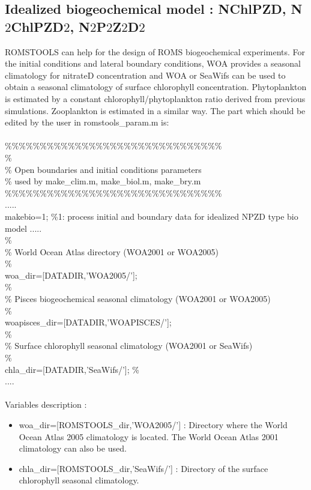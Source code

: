 \subsection{Idealized biogeochemical model : NChlPZD, N$2$ChlPZD$2$, N$2$P$2$Z$2$D$2$}
ROMSTOOLS can help for the design of ROMS biogeochemical
experiments. For the initial conditions and lateral boundary
conditions, WOA provides a seasonal climatology for nitrateD
concentration and WOA or SeaWifs can be used to obtain a 
seasonal climatology of surface chlorophyll concentration.
Phytoplankton is estimated by a constant chlorophyll/phytoplankton 
ratio derived from previous simulations. Zooplankton is estimated
in a similar way. The part which should be edited by the user in 
romstools\_param.m is:\\
\\ 
\%\%\%\%\%\%\%\%\%\%\%\%\%\%\%\%\%\%\%\%\%\%\%\%\%\%\%\%\%\%\%\\
\%\\
\% Open boundaries and initial conditions parameters\\
\%   used by make\_clim.m, make\_biol.m, make\_bry.m\\
\%\%\%\%\%\%\%\%\%\%\%\%\%\%\%\%\%\%\%\%\%\%\%\%\%\%\%\%\%\%\%\\
..... \\
makebio=1;    \%1: process initial and boundary data for idealized NPZD type bio model
..... \\
\noindent \% \\
\% World Ocean Atlas directory (WOA2001 or WOA2005)  \\
\% \\
woa\_dir=[DATADIR,'WOA2005/'];  \\
\% \\
\% Pisces biogeochemical seasonal climatology (WOA2001 or WOA2005)  \\
\% \\
woapisces\_dir=[DATADIR,'WOAPISCES/']; \\
\%\\
\% Surface chlorophyll seasonal climatology (WOA2001 or SeaWifs) \\
\%\\
chla\_dir=[DATADIR,'SeaWifs/'];
\% \\
.... \\ \\
Variables description :
\begin{itemize}
\item woa\_dir=[ROMSTOOLS\_dir,'WOA2005/'] : Directory where the World Ocean
Atlas 2005 climatology \citep{Con02} is located. The World Ocean
Atlas 2001 climatology can also be used.
\item chla\_dir=[ROMSTOOLS\_dir,'SeaWifs/'] : Directory of the surface 
chlorophyll seasonal climatology.
\end{itemize}


